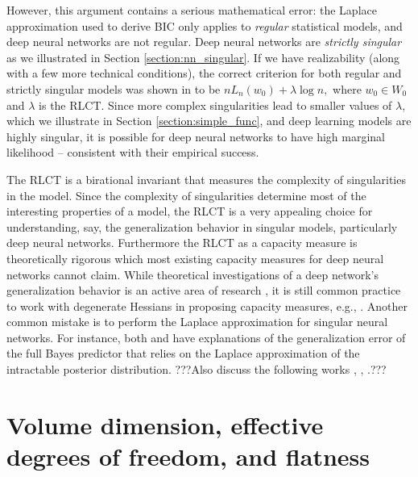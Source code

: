 \documentclass{article} %
\begin{document}
However, this argument contains a serious mathematical error: the Laplace approximation used to derive BIC only applies to \emph{regular} statistical models, and deep neural networks are not regular. Deep neural networks are \textit{strictly singular} as we illustrated in Section \ref{section:nn_singular}. 
If we have realizability (along with a few more technical conditions), the correct criterion for both regular and strictly singular models was shown in \citet{watanabe_widely_2013} to be 
$
nL_n(w_0) + \lambda \log n,
$
where $w_0 \in W_0$ and $\lambda$ is the RLCT. 
Since more complex singularities lead to smaller values of $\lambda$, which we illustrate in Section \ref{section:simple_func}, and deep learning models are highly singular, it is possible for deep neural networks to have high marginal likelihood -- consistent with their empirical success. 

The RLCT is a birational invariant \citep{kollar_birational_1998} that measures the complexity of singularities in the model. Since the complexity of singularities determine most of the interesting properties of a model, the RLCT is a very appealing choice for understanding, say, the generalization behavior in singular models, particularly deep neural networks. Furthermore the RLCT as a capacity measure is theoretically rigorous which most existing capacity measures for deep neural networks cannot claim. While theoretical investigations of a deep network's generalization behavior is an active area of research \cite{neyshabur_exploring_2017}, it is still common practice to work with degenerate Hessians in proposing capacity measures, e.g., \citet{thomas_information_2019}. Another common mistake is to perform the Laplace approximation for singular neural networks. For instance, both \citet{zhang_energyentropy_2018} and  \citet{le_bayesian_2018} have explanations of the generalization error of the full Bayes predictor that relies on the Laplace approximation of the intractable posterior distribution. ???Also discuss the following works \cite{maddox_rethinking_2020}, \cite{gao_degrees_2016}, \cite{sun_lightlike_2020}.???


\section{Volume dimension, effective degrees of freedom, and flatness}
\label{section:no_flat_minima}
\end{document}
